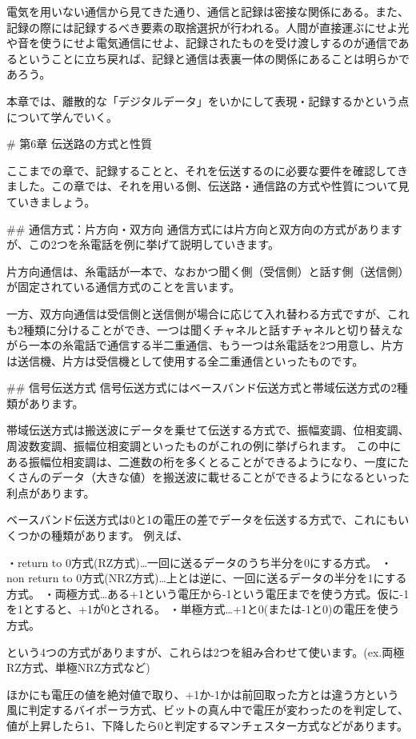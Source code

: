 電気を用いない通信から見てきた通り、通信と記録は密接な関係にある。また、記録の際には記録するべき要素の取捨選択が行われる。人間が直接運ぶにせよ光や音を使うにせよ電気通信にせよ、記録されたものを受け渡しするのが通信であるということに立ち戻れば、記録と通信は表裏一体の関係にあることは明らかであろう。

本章では、離散的な「デジタルデータ」をいかにして表現・記録するかという点について学んでいく。


# 第6章 伝送路の方式と性質

ここまでの章で、記録することと、それを伝送するのに必要な要件を確認してきました。この章では、それを用いる側、伝送路・通信路の方式や性質について見ていきましょう。

## 通信方式：片方向・双方向
通信方式には片方向と双方向の方式がありますが、この2つを糸電話を例に挙げて説明していきます。

片方向通信は、糸電話が一本で、なおかつ聞く側（受信側）と話す側（送信側）が固定されている通信方式のことを言います。

一方、双方向通信は受信側と送信側が場合に応じて入れ替わる方式ですが、これも2種類に分けることができ、一つは聞くチャネルと話すチャネルと切り替えながら一本の糸電話で通信する半二重通信、もう一つは糸電話を2つ用意し、片方は送信機、片方は受信機として使用する全二重通信といったものです。

## 信号伝送方式
信号伝送方式にはベースバンド伝送方式と帯域伝送方式の2種類があります。

帯域伝送方式は搬送波にデータを乗せて伝送する方式で、振幅変調、位相変調、周波数変調、振幅位相変調といったものがこれの例に挙げられます。  
この中にある振幅位相変調は、二進数の桁を多くとることができるようになり、一度にたくさんのデータ（大きな値）を搬送波に載せることができるようになるといった利点があります。

ベースバンド伝送方式は0と1の電圧の差でデータを伝送する方式で、これにもいくつかの種類があります。 
例えば、

・return to 0方式(RZ方式)…一回に送るデータのうち半分を0にする方式。  
・non return to 0方式(NRZ方式)…上とは逆に、一回に送るデータの半分を1にする方式。  
・両極方式…ある+1という電圧から-1という電圧までを使う方式。仮に-1を1とすると、+1が0とされる。  
・単極方式…+1と0(または-1と0)の電圧を使う方式。

という4つの方式がありますが、これらは2つを組み合わせて使います。(ex.両極RZ方式、単極NRZ方式など)

ほかにも電圧の値を絶対値で取り、+1か-1かは前回取った方とは違う方という風に判定するバイポーラ方式、ビットの真ん中で電圧が変わったのを判定して、値が上昇したら1、下降したら0と判定するマンチェスター方式などがあります。

